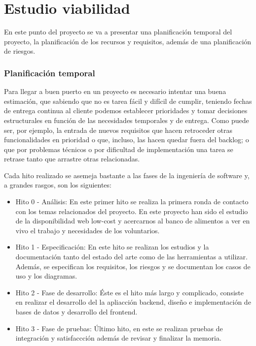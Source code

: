 
\chapter{Estudio viabilidad}
\label{estudioviabilidad}
En este punto del proyecto se va a presentar una planificación temporal del proyecto, la planificación de los recursos y requisitos, además de una planificación de riesgos.
\subsection{Planificación temporal}
Para llegar a buen puerto en un proyecto es necesario intentar una buena estimación, que sabiendo que no es tarea fácil y difícil de cumplir, teniendo fechas de entrega continua al cliente podemos establecer prioridades y tomar decisiones estructurales en función de las necesidades temporales y de entrega. Como puede ser, por ejemplo, la entrada de nuevos requisitos que hacen retroceder otras funcionalidades en prioridad o que, incluso, las hacen quedar fuera del backlog; o que por problemas técnicos o por dificultad de implementación una tarea se retrase tanto que arrastre otras relacionadas.
\vspace{1em}
\par Cada hito realizado se asemeja bastante a las fases de la ingeniería de software y, a grandes rasgos, son los siguientes:
\begin{itemize}
    \item Hito 0 - Análisis:
    En este primer hito se realiza la primera ronda de contacto con los temas relacionados del proyecto. En este proyecto han sido el estudio de la disponibilidad web low-cost y acercarnos al banco de alimentos a ver en vivo el trabajo y necesidades de los voluntarios.
    \item Hito 1 - Especificación:
    En este hito se realizan los estudios y la documentación tanto del estado del arte como de las herramientas a utilizar. Además, se especifican los requisitos, los riesgos y se documentan los casos de uso y los diagramas.
    \item Hito 2 - Fase de desarrollo:
    Éste es el hito más largo y complicado, consiste en realizar el desarrollo del la apliacción backend, diseño e implementación de bases de datos y desarrollo del frontend.
    \item Hito 3 - Fase de pruebas:
    Último hito, en este se realizan pruebas de integración y satisfaccción además de revisar y finalizar la memoria.
\end{itemize}
